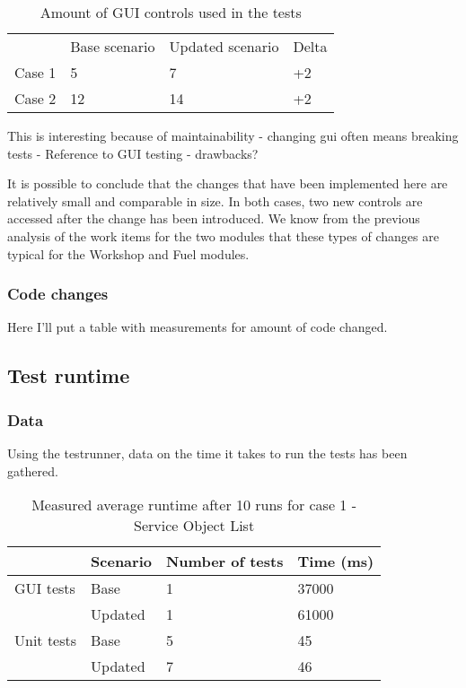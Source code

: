 \documentclass{article}
\begin{document}
			\begin{table}[h!]
				\begin{tabular}{l l l l}
				        & Base scenario & Updated scenario & Delta\\
				 Case 1 & 5      & 7     & +2 \\
				 Case 2 & 12     & 14    & +2 \\
				 \end{tabular}
				 \caption{Amount of GUI controls used in the tests}
			 \end{table}

			 This is interesting because of maintainability - changing gui often means breaking tests - Reference to GUI testing - drawbacks?

			 It is possible to conclude that the changes that have been implemented here are relatively small and comparable in size. In both cases, two new controls are accessed after the change has been introduced. We know from the previous analysis of the work items for the two modules that these types of changes are typical for the Workshop and Fuel modules.

			 \subsubsection{Code changes}

			 Here I'll put a table with measurements for amount of code changed.

		\subsection{Test runtime}

			\subsubsection{Data}
			Using the testrunner, data on the time it takes to run the tests has been gathered. 

			\begin{table}[h!]
				\begin{tabular}{l |l |l l}
				        & Scenario & Number of tests & Time (ms)\\
				\hline
				 GUI tests & Base     & 1               & 37000 \\
				        & Updated  & 1    			 & 61000 \\
				\hline
				 Unit tests & Base     & 5               & 45 \\
				 		& Updated  & 7               & 46 \\
				 \end{tabular}
				 \caption{Measured average runtime after 10 runs for case 1 - Service Object List}
			 \end{table}
\end{document}
